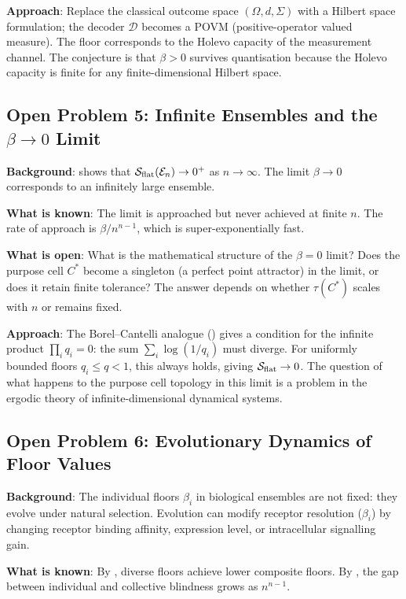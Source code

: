\textbf{Approach}: Replace the classical outcome space $(\Omega, d, \Sigma)$
with a Hilbert space formulation; the decoder $\mathcal{D}$ becomes a POVM
(positive-operator valued measure).  The floor corresponds to the Holevo
capacity of the measurement channel.  The conjecture is that $\beta > 0$
survives quantisation because the Holevo capacity is finite for any finite-dimensional
Hilbert space.

\subsection{Open Problem 5: Infinite Ensembles and the $\beta \to 0$ Limit}

\textbf{Background}:  shows that
$\mathcal{S}_{\mathrm{flat}}(\mathcal{E}_n) \to 0^+$ as $n \to \infty$.  The
limit $\beta \to 0$ corresponds to an infinitely large ensemble.

\textbf{What is known}: The limit is approached but never achieved at finite $n$.
The rate of approach is $\beta/n^{n-1}$, which is super-exponentially fast.

\textbf{What is open}: What is the mathematical structure of the $\beta = 0$
limit?  Does the purpose cell $C^*$ become a singleton (a perfect point
attractor) in the limit, or does it retain finite tolerance?  The answer
depends on whether $\tau(C^*)$ scales with $n$ or remains fixed.

\textbf{Approach}: The Borel--Cantelli analogue ()
gives a condition for the infinite product $\prod_i q_i = 0$: the sum
$\sum_i \log(1/q_i)$ must diverge.  For uniformly bounded floors $q_i \leq q < 1$,
this always holds, giving $\mathcal{S}_{\mathrm{flat}} \to 0$.  The question of what
happens to the purpose cell topology in this limit is a problem in the ergodic
theory of infinite-dimensional dynamical systems.

\subsection{Open Problem 6: Evolutionary Dynamics of Floor Values}

\textbf{Background}: The individual floors $\beta_i$ in biological ensembles
are not fixed: they evolve under natural selection.  Evolution can modify
receptor resolution ($\beta_i$) by changing receptor binding affinity,
expression level, or intracellular signalling gain.

\textbf{What is known}: By , diverse floors
achieve lower composite floors.  By ,
the gap between individual and collective blindness grows as $n^{n-1}$.

